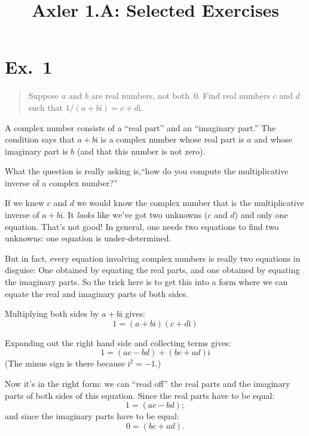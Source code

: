 \documentclass[10pt, a4paper, twocolumn]{article}
\title{Axler 1.A: Selected Exercises}
\date{}
\author{}
\newcommand{\ii}{\mathrm{i}}
\begin{document}
\maketitle
\section*{Ex.~1}
\begin{quote}
Suppose $a$ and $b$ are real numbers, not both~0. Find real numbers $c$ and $d$ such that
$1 / (a + b\ii) = c + d\ii$.
\end{quote}
A complex number consists of a “real part” and an ``imaginary part.'' The condition says that $a + b\ii$ is a complex number whose real part is $a$ and whose imaginary part is $b$ (and that this number is not zero).

What the question is really asking is,``how do you compute the multiplicative inverse of a complex number?''

If we knew $c$ and $d$ we would know the complex number that is the multiplicative inverse of $a + b\ii$. It \emph{looks} like we’ve got two unknowns ($c$ and $d$) and only one equation. That’s not good! In general, one needs two equations to find two unknowns: one equation is under-determined.

But in fact, every equation involving complex numbers is really two equations in disguise: One obtained by equating the real parts, and one obtained by equating the imaginary parts. So the trick here is to get this into a form where we can equate the real and imaginary parts of both sides.

Multiplying both sides by $a + b\ii$ gives:
\begin{equation*}
  1 = (a + b\ii) (c + d\ii)
\end{equation*}

Expanding out the right hand side and collecting terms gives:
\begin{equation*}
  1 = (ac - bd) + (bc + ad) \ii
\end{equation*}
(The minus sign is there because $\ii^2 = -1$.) 

Now it’s in the right form: we can “read off” the real parts and the imaginary parts of both sides of this equation. Since the real parts have to be equal:
\begin{equation*}
  1 = (ac - bd);
\end{equation*}
and since the imaginary parts have to be equal:
\begin{equation*}
0 = (bc + ad).
\end{equation*}
\end{document}
